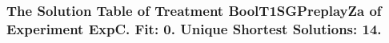  \begin{frame}
 \fontsize{8pt}{9pt}\selectfont
 \frametitle{ The Solution Table of Treatment BoolT1SGPreplayZa of Experiment ExpC. Fit: 0. Unique Shortest Solutions: 14. }

 \label{ExpCSolutionTable002.tex}  
 \end{frame}

